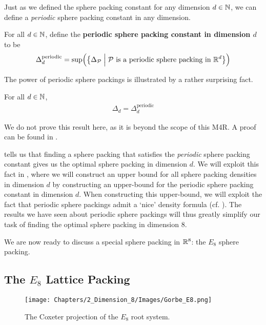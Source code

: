 Just as we defined the sphere packing constant for any dimension $d \in \mathbb{N}$, we can define a \textit{periodic} sphere packing constant in any dimension.

\begin{boxdefinition}
    For all $d \in \mathbb{N}$, define the \textbf{periodic sphere packing constant in dimension $d$} to be
    \begin{align*}
        \Delta_{d}^{\text{periodic}} = \sup\!\left( {\left\{ \Delta_{\mathcal{P}} \; \middle\vert \; \mathcal{P} \text{ is a periodic sphere packing in } \mathbb{R}^d \right\}} \right)
    \end{align*}
\end{boxdefinition}

The power of periodic sphere packings is illustrated by a rather surprising fact.

\begin{boxproposition}\label{Ch2:Prop:Periodic_Const_eq_Const}
    For all $d \in \mathbb{N}$,
    \begin{align*}
        \Delta_{d} = \Delta_{d}^{\text{periodic}}
    \end{align*}
\end{boxproposition}

We do not prove this result here, as it is beyond the scope of this M4R. A proof can be found in \cite[Appendix A]{CohnElkies}.

 tells us that finding a sphere packing that satisfies the \textit{periodic} sphere packing constant gives us the optimal sphere packing in dimension $d$. We will exploit this fact in , where we will construct an upper bound for all sphere packing densities in dimension $d$ by constructing an upper-bound for the periodic sphere packing constant in dimension $d$. When constructing this upper-bound, we will exploit the fact that periodic sphere packings admit a `nice' density formula (cf. ). The results we have seen about periodic sphere packings will thus greatly simplify our task of finding the optimal sphere packing in dimension $8$.

We are now ready to discuss a special sphere packing in $\mathbb{R}^8$: the $E_8$ sphere packing.

\subsection{The $E_8$ Lattice Packing}\label{Ch2:Subsec:E8}

\begin{wrapfigure}[18]{r}{0.5\linewidth}
    \vspace{-3em}
    \centering
    \texttt{[image: Chapters/2\_Dimension\_8/Images/Gorbe\_E8.png]}
    \caption{The Coxeter projection of the $E_8$ root system. \cite{Gorbe_E8}}
    \label{Ch2:Fig:Gorbe_E8}
\end{wrapfigure}

